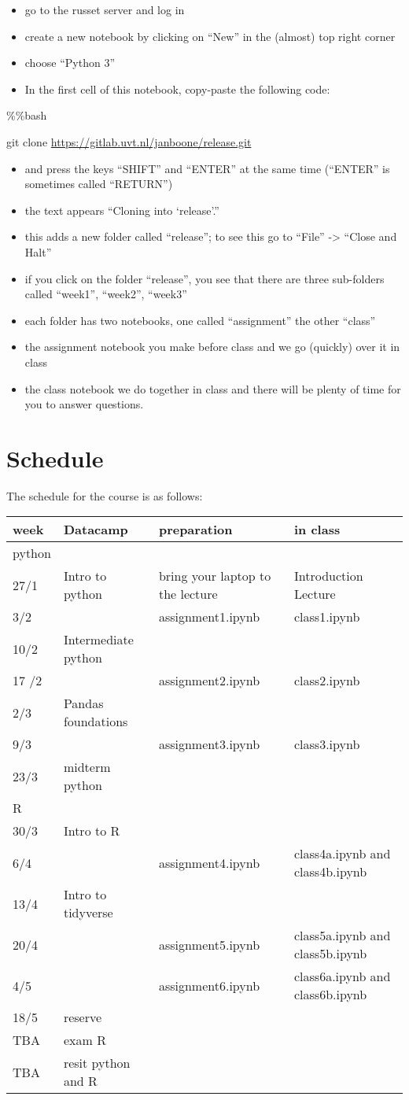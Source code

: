 \documentclass[]{book}
\providecommand{\tightlist}{%
  \setlength{\itemsep}{0pt}\setlength{\parskip}{0pt}}
\begin{document}
\begin{itemize}
\tightlist
\item
  go to the russet server and log in
\item
  create a new notebook by clicking on ``New'' in the (almost) top right corner
\item
  choose ``Python 3''
\item
  In the first cell of this notebook, copy-paste the following code:
\end{itemize}

\%\%bash

git clone \url{https://gitlab.uvt.nl/janboone/release.git}

\begin{itemize}
\tightlist
\item
  and press the keys ``SHIFT'' and ``ENTER'' at the same time (``ENTER'' is sometimes called ``RETURN'')
\item
  the text appears ``Cloning into `release'.''
\item
  this adds a new folder called ``release''; to see this go to ``File'' -\textgreater{} ``Close and Halt''
\item
  if you click on the folder ``release'', you see that there are three sub-folders called ``week1'', ``week2'', ``week3''
\item
  each folder has two notebooks, one called ``assignment'' the other ``class''
\item
  the assignment notebook you make before class and we go (quickly) over it in class
\item
  the class notebook we do together in class and there will be plenty of time for you to answer questions.
\end{itemize}

\hypertarget{schedule-1}{%
\section{Schedule}\label{schedule-1}}

The schedule for the course is as follows:

\begin{longtable}[]{@{}llll@{}}
\toprule
week & Datacamp & preparation & in class\tabularnewline
\midrule
\endhead
python & & &\tabularnewline
27/1 & Intro to python & bring your laptop to the lecture & Introduction Lecture\tabularnewline
3/2 & & assignment1.ipynb & class1.ipynb\tabularnewline
10/2 & Intermediate python & &\tabularnewline
17 /2 & & assignment2.ipynb & class2.ipynb\tabularnewline
2/3 & Pandas foundations & &\tabularnewline
9/3 & & assignment3.ipynb & class3.ipynb\tabularnewline
23/3 & midterm python & &\tabularnewline
R & & &\tabularnewline
30/3 & Intro to R & &\tabularnewline
6/4 & & assignment4.ipynb & class4a.ipynb and class4b.ipynb\tabularnewline
13/4 & Intro to tidyverse & &\tabularnewline
20/4 & & assignment5.ipynb & class5a.ipynb and class5b.ipynb\tabularnewline
4/5 & & assignment6.ipynb & class6a.ipynb and class6b.ipynb\tabularnewline
18/5 & reserve & &\tabularnewline
TBA & exam R & &\tabularnewline
TBA & resit python and R & &\tabularnewline
\bottomrule
\end{longtable}
\end{document}
